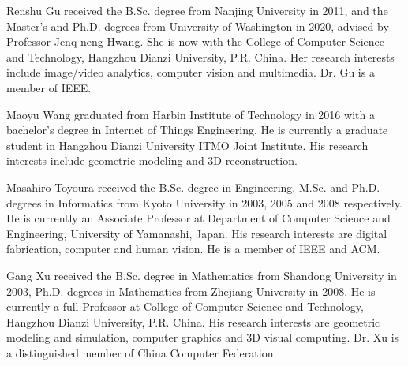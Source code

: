 \documentclass[journal]{IEEEtran}
\begin{document}
\begin{IEEEbiography}{Renshu Gu}
received the B.Sc. degree from Nanjing University in 2011, and the Master's and Ph.D. degrees from University of Washington in 2020, advised by Professor Jenq-neng Hwang. She is now with the College of Computer Science and Technology, Hangzhou Dianzi University, P.R. China. Her research interests include image/video analytics, computer vision and multimedia. Dr. Gu is a member of IEEE.
\end{IEEEbiography}


\begin{IEEEbiography}{Maoyu Wang} graduated from Harbin Institute of Technology in 2016 with a bachelor's degree in Internet of Things Engineering. He is currently a graduate student in Hangzhou Dianzi University ITMO Joint Institute. His research interests include geometric modeling and 3D reconstruction.
\end{IEEEbiography}

\begin{IEEEbiography}{Masahiro Toyoura}
received the B.Sc. degree in Engineering, M.Sc. and Ph.D. degrees in Informatics from Kyoto University in 2003, 2005 and 2008 respectively. 
He is currently an Associate Professor at Department of Computer Science and Engineering, University of Yamanashi, Japan. 
His research interests are digital fabrication, computer and human vision. He is a member of IEEE and ACM.
\end{IEEEbiography}

\begin{IEEEbiography}{Gang Xu}
received the B.Sc. degree in Mathematics from Shandong University in 2003,  Ph.D. degrees in Mathematics from Zhejiang University in 2008. 
He is currently a full Professor at College of Computer Science and Technology, Hangzhou Dianzi University, P.R. China.
His research interests are geometric modeling and simulation, computer graphics and 3D visual computing. Dr. Xu is a distinguished member of China Computer Federation. 
\end{IEEEbiography}
\end{document}
